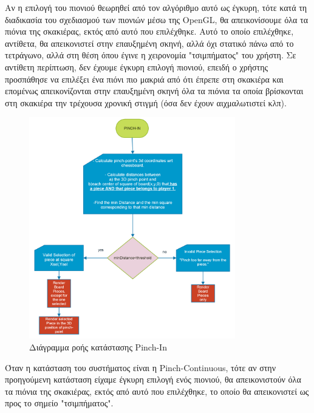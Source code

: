 Αν η επιλογή του πιονιού θεωρηθεί από τον αλγόριθμο αυτό ως έγκυρη, τότε κατά τη διαδικασία του σχεδιασμού των πιονιών μέσω της OpenGL, θα απεικονίσουμε όλα τα πιόνια της σκακιέρας, εκτός από αυτό που επιλέχθηκε. Αυτό το οποίο επιλέχθηκε, αντίθετα, θα απεικονιστεί στην επαυξημένη σκηνή, αλλά όχι στατικό πάνω από το τετράγωνο, αλλά στη θέση όπου έγινε η χειρονομία "τσιμπήματος" του χρήστη. Σε αντίθετη περίπτωση, δεν έχουμε έγκυρη επιλογή πιονιού, επειδή ο χρήστης προσπάθησε να επιλέξει ένα πιόνι πιο μακριά από ότι έπρεπε στη σκακιέρα και επομένως απεικονίζονται στην επαυξημένη σκηνή όλα τα πιόνια τα οποία βρίσκονται στη σκακιέρα την τρέχουσα χρονική στιγμή (όσα δεν έχουν αιχμαλωτιστεί κλπ).




\begin{figure}[H]
    \centering
    \includegraphics[width=0.8\textwidth]{Files/Figures/pinch_in.png}
    \caption[Διάγραμμα ροής κατάστασης Pinch-In]{Διάγραμμα ροής κατάστασης Pinch-In}
    \label{fig:pinch-in}
\end{figure}


Όταν η κατάσταση του συστήματος είναι η Pinch-Continuous, τότε αν στην προηγούμενη κατάσταση είχαμε έγκυρη επιλογή ενός πιονιού, θα απεικονιστούν όλα τα πιόνια της σκακιέρας, εκτός από αυτό που επιλέχθηκε, το οποίο θα απεικονιστεί ως προς το σημείο "τσιμπήματος". 

